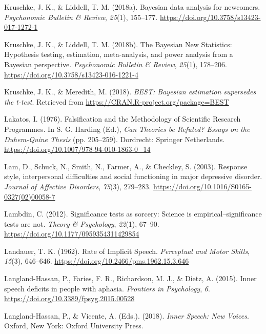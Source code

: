 \documentclass[a4paper,12pt,twoside,openright,oldfontcommands,final]{memoir}
\begin{document}
\leavevmode\hypertarget{ref-kruschke_bayesian_2018}{}%
Kruschke, J. K., \& Liddell, T. M. (2018a). Bayesian data analysis for newcomers. \emph{Psychonomic Bulletin \& Review}, \emph{25}(1), 155--177. \url{https://doi.org/10.3758/s13423-017-1272-1}

\leavevmode\hypertarget{ref-kruschke_bayesian_2018-1}{}%
Kruschke, J. K., \& Liddell, T. M. (2018b). The Bayesian New Statistics: Hypothesis testing, estimation, meta-analysis, and power analysis from a Bayesian perspective. \emph{Psychonomic Bulletin \& Review}, \emph{25}(1), 178--206. \url{https://doi.org/10.3758/s13423-016-1221-4}

\leavevmode\hypertarget{ref-R-BEST}{}%
Kruschke, J. K., \& Meredith, M. (2018). \emph{BEST: Bayesian estimation supersedes the t-test}. Retrieved from \url{https://CRAN.R-project.org/package=BEST}

\leavevmode\hypertarget{ref-lakatos_falsification_1976}{}%
Lakatos, I. (1976). Falsification and the Methodology of Scientific Research Programmes. In S. G. Harding (Ed.), \emph{Can Theories be Refuted? Essays on the Duhem-Quine Thesis} (pp. 205--259). Dordrecht: Springer Netherlands. \url{https://doi.org/10.1007/978-94-010-1863-0_14}

\leavevmode\hypertarget{ref-lam_response_2003}{}%
Lam, D., Schuck, N., Smith, N., Farmer, A., \& Checkley, S. (2003). Response style, interpersonal difficulties and social functioning in major depressive disorder. \emph{Journal of Affective Disorders}, \emph{75}(3), 279--283. \url{https://doi.org/10.1016/S0165-0327(02)00058-7}

\leavevmode\hypertarget{ref-Lambdin2012}{}%
Lambdin, C. (2012). Significance tests as sorcery: Science is empirical--significance tests are not. \emph{Theory \& Psychology}, \emph{22}(1), 67--90. \url{https://doi.org/10.1177/0959354311429854}

\leavevmode\hypertarget{ref-landauer_rate_1962}{}%
Landauer, T. K. (1962). Rate of Implicit Speech. \emph{Perceptual and Motor Skills}, \emph{15}(3), 646--646. \url{https://doi.org/10.2466/pms.1962.15.3.646}

\leavevmode\hypertarget{ref-langland-hassan_inner_2015}{}%
Langland-Hassan, P., Faries, F. R., Richardson, M. J., \& Dietz, A. (2015). Inner speech deficits in people with aphasia. \emph{Frontiers in Psychology}, \emph{6}. \url{https://doi.org/10.3389/fpsyg.2015.00528}

\leavevmode\hypertarget{ref-langland-hassan_inner_2018}{}%
Langland-Hassan, P., \& Vicente, A. (Eds.). (2018). \emph{Inner Speech: New Voices}. Oxford, New York: Oxford University Press.
\end{document}
